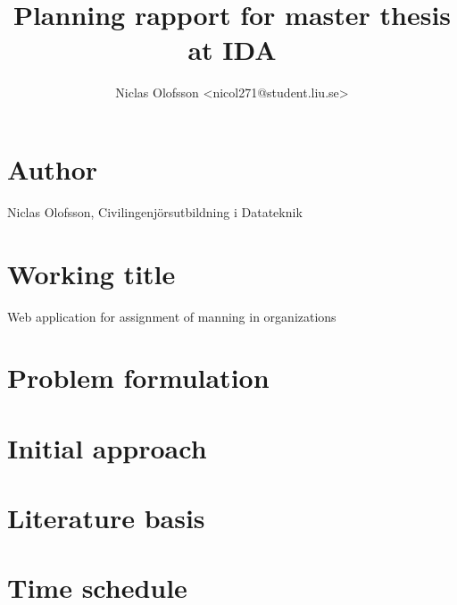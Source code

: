 \documentclass[a4paper]{article}
\author{Niclas Olofsson <nicol271@student.liu.se>}
\title{Planning rapport for master thesis at IDA}
\begin{document}
\maketitle

\section{Author}
Niclas Olofsson, Civilingenjörsutbildning i Datateknik

\section{Working title}
Web application for assignment of manning in organizations

\section{Problem formulation}


\section{Initial approach}


\section{Literature basis}


\section{Time schedule}

\end{document}

